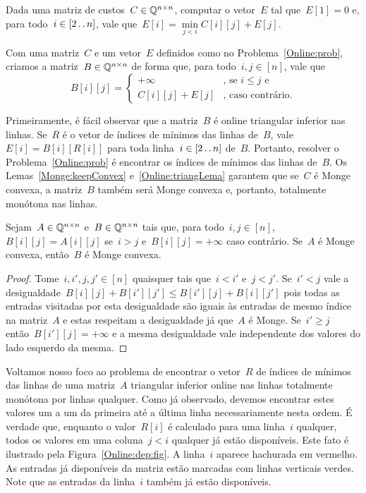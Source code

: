 \begin{prob} \label{Online:prob}
Dada uma matriz de custos~$C \in \mathbb{Q}^{n \times n}$, computar o vetor~$E$ tal que~$E[1] = 0$ e, para todo~$i \in [2 \,.\,.\, n]$, vale que~$E[i] = \min\limits_{j < i} C[i][j] + E[j]$.
\end{prob}

Com uma matriz~$C$ e um vetor~$E$ definidos como no Problema~\ref{Online:prob}, criamos a matriz~$B \in \mathbb{Q}^{n \times n}$ de forma que, para todo~$i,j \in [n]$, vale que
\begin{equation} \label{Online:Bmat}
    B[i][j] = \begin{cases}
        +\infty & \text{, se } i \leq j \text{ e } \\
        C[i][j] + E[j]    & \text{, caso contrário.}
    \end{cases}
\end{equation}

Primeiramente, é fácil observar que a matriz~$B$ é online triangular inferior nas linhas. Se~$R$ é o vetor de índices de mínimos das linhas de~$B$, vale~$E[i] = B[i][R[i]]$ para toda linha~$i \in [2 \,.\,.\, n]$ de~$B$. Portanto, resolver o Problema~\ref{Online:prob} é encontrar os índices de mínimos das linhas de~$B$. Os Lemas~\ref{Monge:keepConvex} e~\ref{Online:triangLema} garantem que se~$C$ é Monge convexa, a matriz~$B$ também será Monge convexa e, portanto, totalmente monótona nas linhas. 

\begin{lema} \label{Online:triangLema}
Sejam~${ A \in \mathbb{Q}^{n \times n} }$ e~${ B \in \mathbb{Q}^{n \times n} }$ tais que, para todo~${ i,j \in [n] }$,~${ B[i][j] = A[i][j] }$ se~${ i > j }$ e~${ B[i][j] = +\infty }$ caso contrário. Se~$A$ é Monge convexa, então~$B$ é Monge convexa.
\end{lema}

\begin{proof}
Tome~${ i,i',j,j' \in [n] }$ quaisquer tais que~${ i < i' }$ e~${ j < j' }$. Se~${ i' < j }$ vale a desigualdade~${ B[i][j] + B[i'][j'] \leq B[i'][j] + B[i][j'] }$ pois todas as entradas visitadas por esta desigualdade são iguais às entradas de mesmo índice na matriz~$A$ e estas respeitam a desigualdade já que~$A$ é Monge. Se~${ i' \geq j }$ então~${ B[i'][j] = +\infty }$ e a mesma desigualdade vale independente dos valores do lado esquerdo da mesma.
\end{proof}

Voltamos nosso foco ao problema de encontrar o vetor~$R$ de índices de mínimos das linhas de uma matriz~$A$ triangular inferior online nas linhas totalmente monótona por linhas qualquer. Como já observado, devemos encontrar estes valores um a um da primeira até a última linha necessariamente nesta ordem. É verdade que, enquanto o valor~$R[i]$ é calculado para uma linha~$i$ qualquer, todos os valores em uma coluna~${ j < i }$ qualquer já estão disponíveis. Este fato é ilustrado pela Figura~\ref{Online:dep:fig}. A linha~$i$ aparece hachurada em vermelho. As entradas já disponíveis da matriz estão marcadas com linhas verticais verdes. Note que as entradas da linha~$i$ também já estão disponíveis.

